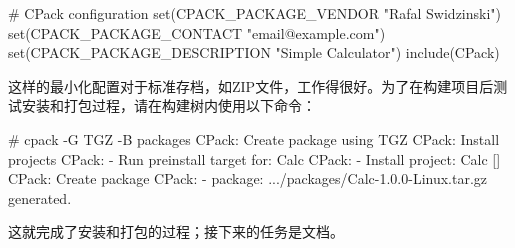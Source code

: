 \begin{cmake}
# CPack configuration
set(CPACK_PACKAGE_VENDOR "Rafal Swidzinski")
set(CPACK_PACKAGE_CONTACT "email@example.com")
set(CPACK_PACKAGE_DESCRIPTION "Simple Calculator")
include(CPack)
\end{cmake}

这样的最小化配置对于标准存档，如ZIP文件，工作得很好。为了在构建项目后测试安装和打包过程，请在构建树内使用以下命令：

\begin{shell}
# cpack -G TGZ -B packages
CPack: Create package using TGZ
CPack: Install projects
CPack: - Run preinstall target for: Calc
CPack: - Install project: Calc []
CPack: Create package
CPack: - package: .../packages/Calc-1.0.0-Linux.tar.gz generated.
\end{shell}

这就完成了安装和打包的过程；接下来的任务是文档。















